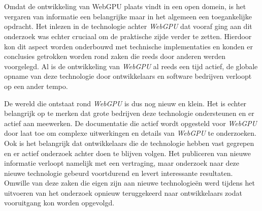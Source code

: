 
\chapter{}%
\label{ch:methodologie}


Omdat de ontwikkeling van WebGPU plaats vindt in een open domein, is het vergaren van informatie een belangrijke maar in het algemeen een toegankelijke opdracht. Het inlezen in de technologie achter \textit{WebGPU} dat vooraf ging aan dit onderzoek was echter cruciaal om de praktische zijde verder te zetten. Hierdoor kon dit aspect worden onderbouwd met technische implementaties en konden er conclusies getrokken worden rond zaken die reeds door anderen werden voorgelegd. Al is de ontwikkeling van \textit{WebGPU} al reeds een tijd actief, de globale opname van deze technologie door ontwikkelaars en software bedrijven verloopt op een ander tempo. 

\bigbreak{}

De wereld die ontstaat rond \textit{WebGPU} is dus nog nieuw en klein. Het is echter belangrijk op te merken dat grote bedrijven deze technologie ondersteunen en er actief aan meewerken. De documentatie die actief wordt opgesteld voor \textit{WebGPU} door \textcite{W3C2023} laat toe om complexe uitwerkingen en details van \textit{WebGPU} te onderzoeken. Ook is het belangrijk dat ontwikkelaars die de technologie hebben vast gegrepen en er actief onderzoek achter doen te blijven volgen. Het publiceren van nieuwe informatie verloopt namelijk met een vertraging, maar onderzoek naar deze nieuwe technologie gebeurd voortdurend en levert interessante resultaten. Omwille van deze zaken die eigen zijn aan nieuwe technologieën werd tijdens het uitvoeren van het onderzoek opnieuw teruggekeerd naar ontwikkelaars zodat vooruitgang kon worden opgevolgd.

